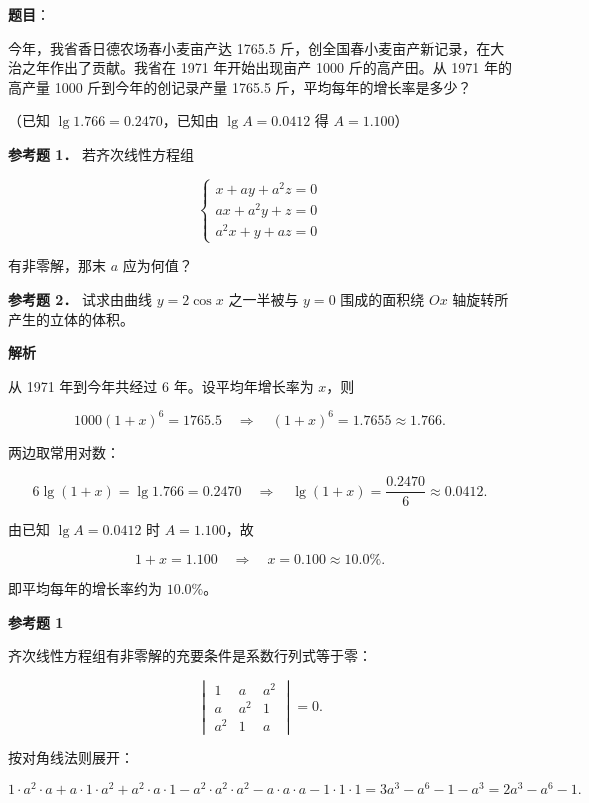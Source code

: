 \begin{answer}

\textbf{题目}：

今年，我省香日德农场春小麦亩产达 1765.5 斤，创全国春小麦亩产新记录，在大治之年作出了贡献。我省在 1971 年开始出现亩产 1000 斤的高产田。从 1971 年的高产量 1000 斤到今年的创记录产量 1765.5 斤，平均每年的增长率是多少？

（已知 $\lg1.766=0.2470$，已知由 $\lg A=0.0412$ 得 $A=1.100$）

\textbf{参考题 1．} 若齐次线性方程组

\nopagebreak[4]
\[
\begin{cases}
x+ay+a^2z=0\\
ax+a^2y+z=0\\
a^2x+y+az=0
\end{cases}
\]

有非零解，那末 $a$ 应为何值？

\textbf{参考题 2．} 试求由曲线 $y=2\cos x$ 之一半被与 $y=0$ 围成的面积绕 $Ox$ 轴旋转所产生的立体的体积。

\textbf{解析}

从 1971 年到今年共经过 $6$ 年。设平均年增长率为 $x$，则

\nopagebreak[4]
\[
1000(1+x)^6=1765.5
\quad\Longrightarrow\quad
(1+x)^6=1.7655\approx1.766.
\]

两边取常用对数：

\nopagebreak[4]
\[
6\lg(1+x)=\lg1.766=0.2470
\quad\Longrightarrow\quad
\lg(1+x)=\frac{0.2470}{6}\approx0.0412.
\]

由已知 $\lg A=0.0412$ 时 $A=1.100$，故

\nopagebreak[4]
\[
1+x=1.100
\quad\Longrightarrow\quad
x=0.100\approx10.0\%.
\]

即平均每年的增长率约为 $10.0\%$。

\textbf{参考题 1}

齐次线性方程组有非零解的充要条件是系数行列式等于零：

\nopagebreak[4]
\[
\begin{vmatrix}
1 & a & a^2\\
a & a^2 & 1\\
a^2 & 1 & a
\end{vmatrix}=0.
\]

按对角线法则展开：

\nopagebreak[4]
\[
1\cdot a^2\cdot a+a\cdot1\cdot a^2+a^2\cdot a\cdot1
-a^2\cdot a^2\cdot a^2-a\cdot a\cdot a-1\cdot1\cdot1
=3a^3-a^6-1-a^3=2a^3-a^6-1.
\]


\end{answer}
